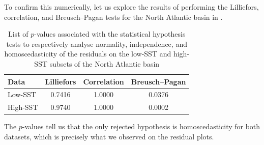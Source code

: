 To confirm this numerically, let us explore the results of performing the Lilliefors, correlation, and Breusch--Pagan tests for the North Atlantic basin in .
\begin{table}[H]
	\centering
	\begin{tabular}{lccc}
		\toprule
		\toprule
		Data     & Lilliefors   & Correlation  & Breusch--Pagan \\
		\midrule
		Low-SST  & \num{0.7416} & \num{1.0000} & \num{0.0376}   \\
		High-SST & \num{0.9740} & \num{1.0000} & \num{0.0002}   \\
		\bottomrule
	\end{tabular}
	\caption{List of $p$-values associated with the statistical hypothesis tests to respectively analyse normality, independence, and homoscedasticity of the residuals on the low-SST and high-SST subsets of the North Atlantic basin}
	\label{tab:stat-tests-natl}
\end{table}
The $p$-values tell us that the only rejected hypothesis is homoscedasticity for both datasets, which is precisely what we observed on the residual plots.

